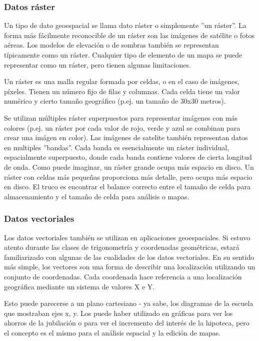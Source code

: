 \subsubsection{Datos ráster}\label{label_rasterdata}

Un tipo de dato geoespacial se llama dato ráster o simplemente ''un ráster''. 
La forma más fácilmente reconocible de un ráster son las imágenes de satélite
o fotos aéreas. Los modelos de elevación o de sombras también se representan 
típicamente como un ráster. Cualquier tipo de elemento de un mapa se puede 
representar como un ráster, pero tienen algunas limitaciones.

Un ráster es una malla regular formada por celdas, o en el caso de imágenes, 
píxeles. Tienen un número fijo de filas y columnas. Cada celda tiene un valor 
numérico y cierto tamaño geográfico (p.ej. un tamaño de 30x30 metros).

Se utilizan múltiples ráster superpuestos para representar imágenes con más 
colores (p.ej. un ráster por cada valor de rojo, verde y azul se combinan para 
crear una imágen en color). Las imágenes de satelite también representan datos 
en multiples ''bandas''. Cada banda es esencialmente un ráster individual,
espacialmente superpuesto, donde cada banda contiene valores de cierta longitud
de onda. Como puede imaginar, un ráster grande ocupa más espacio en disco. 
Un ráster con celdas más pequeñas proporciona más detalle, pero ocupa más 
espacio en disco. El truco es encontrar el balance correcto entre el tamaño 
de celda para almacenamiento y el tamaño de celda para análisis o mapas.

\subsubsection{Datos vectoriales}\label{label_vectordata}

Los datos vectoriales también se utilizan en aplicaciones geoespaciales. 
Si estuvo atento durante las clases de trigonometría y coordenadas 
geométricas, estará familiarizado con algunas de las cualidades de los datos 
vectoriales. En su sentido más simple, los vectores son una forma de describir 
una localización utilizando un conjunto de coordenadas. Cada coordenada hace 
referencia a una localización geográfica mediante un sistema de valores X e Y.

Esto puede parecerse a un plano cartesiano - ya sabe, los diagramas de la 
escuela que mostraban ejes x, y. Los puede haber utilizado en gráficas para 
ver los ahorros de la jubilación o para ver el incremento del interés de la 
hipoteca, pero el concepto es el mismo para el análisis espacial y la edición 
de mapas.

